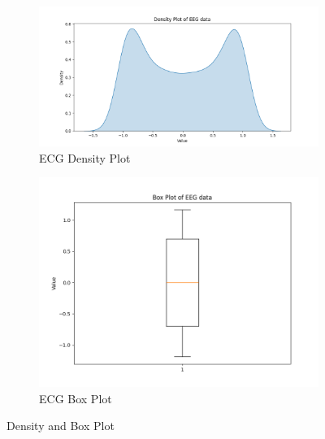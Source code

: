 \documentclass{article}
\begin{document}
\begin{figure}[htbp]
  \centering
  \begin{subfigure}[b]{0.45\textwidth}
    \includegraphics[width=\textwidth]{img/ecg2/ECGdensity.png}
    \caption{ECG Density Plot}
    \label{fig:ecgdensity}
  \end{subfigure}
  \hfill
  \begin{subfigure}[b]{0.45\textwidth}
    \includegraphics[width=\textwidth]{img/ecg2/ECGbox.png}
    \caption{ECG Box Plot}
    \label{fig:ecgbox}
  \end{subfigure}
  \caption{Density and Box Plot}
  \label{fig:ecg2_2}
\end{figure}
\end{document}
